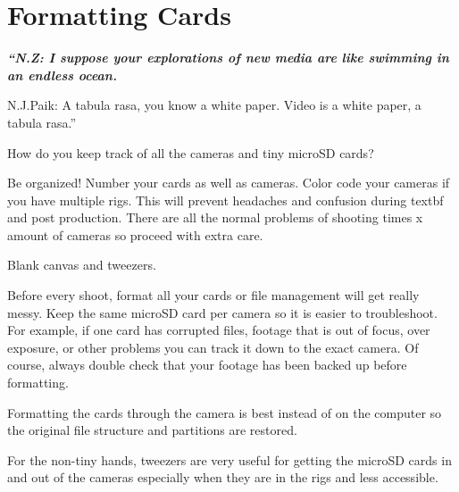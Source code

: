 \section{Formatting Cards}
\pagecolor{white}
\label{chap:4}
\begin{fullwidth}

{\itshape\bfseries “N.Z: I suppose your explorations of new media are like swimming in an endless ocean. 

N.J.Paik: A tabula rasa, you know a white paper. Video is a white paper, a tabula rasa.”}

\vspace{\baselineskip}

\problem

{\large How do you keep track of all the cameras and tiny microSD cards? \par}

Be organized! Number your cards as well as cameras. Color code your cameras if you have multiple rigs. This will prevent headaches and confusion during textbf{} and post production. There are all the normal problems of shooting times x amount of cameras so proceed with extra care. 


\solution

{\large Blank canvas and tweezers. \par}

Before every shoot, format all your cards or file management will get really messy. Keep the same microSD card per camera so it is easier to troubleshoot. For example, if one card has corrupted files, footage that is out of focus, over exposure, or other problems you can track it down to the exact camera. Of course, always double check that your footage has been backed up before formatting. 

Formatting the cards through the camera is best instead of on the computer so the original file structure and partitions are restored. 


\tip For the non-tiny hands, tweezers are very useful for getting the microSD cards in and out of the cameras especially when they are in the rigs and less accessible. 



\clearpage
\end{fullwidth}
